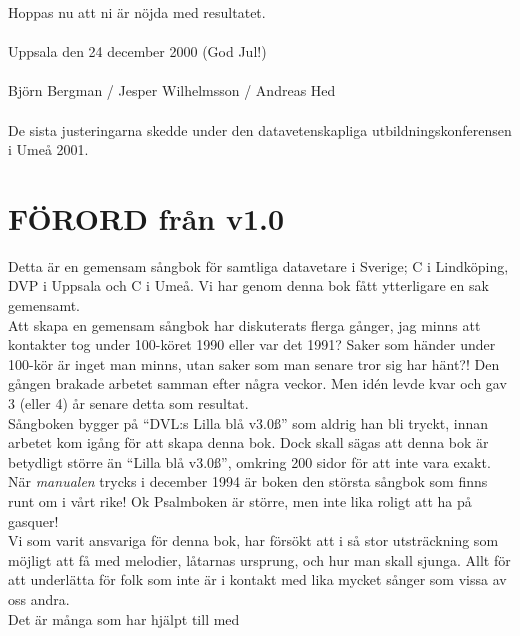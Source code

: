 \documentclass[a6paper,fontsize=10pt,twoside,open=right]{scrbook}
\begin{document}
\noindent Hoppas nu att ni är nöjda med
resultatet.\\ \\ Uppsala den 24 december 2000 (God Jul!)\\ \\ Björn
Bergman / Jesper Wilhelmsson / Andreas Hed\\ \\ De sista justeringarna
skedde under den datavetenskapliga utbildningskonferensen i Umeå 2001.
\cleardoublepage
\section{FÖRORD från v1.0}\vspace{10pt}
\hspace{10pt}Detta är en gemensam sångbok för samtliga datavetare
i Sverige; C i Lindköping, DVP i Uppsala och C i Umeå. Vi har genom
denna bok fått ytterligare en sak gemensamt.\\ \indent Att skapa en
gemensam sångbok har diskuterats flerga gånger, jag minns att
kontakter tog under 100-köret 1990 eller var det 1991?  Saker som
händer under 100-kör är inget man minns, utan saker som man senare
tror sig har hänt?! Den gången brakade arbetet samman efter några
veckor. Men idén levde kvar och gav 3 (eller 4) år senare detta som
resultat.\\ \indent Sångboken bygger på ``DVL:s Lilla blå v3.0\ss''
som aldrig han bli tryckt, innan arbetet kom igång för att skapa denna
bok. Dock skall sägas att denna bok är betydligt större än ``Lilla blå
v3.0\ss'', omkring 200 sidor för att inte vara exakt.\\ \indent När
\textit{manualen} trycks i december 1994 är boken den största sångbok
som finns runt om i vårt rike! Ok Psalmboken är större, men inte lika
roligt att ha på gasquer!\\ \indent Vi som varit ansvariga för denna
bok, har försökt att i så stor utsträckning som möjligt att få med
melodier, låtarnas ursprung, och hur man skall sjunga. Allt för att
underlätta för folk som inte är i kontakt med lika mycket sånger som
vissa av oss andra.\\ \indent Det är många som har hjälpt till med
\end{document}

